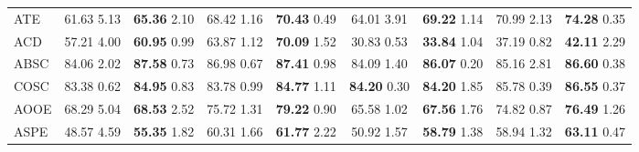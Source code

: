 \documentclass[11pt]{article}
\begin{document}
\begin{table*}[]
{\begin{tabular}{l|cccc|cccc}
ATE                            & 61.63             \tiny{  5.13}            &\multicolumn{1}{c|}{ \textbf{65.36}        \tiny{ 2.10}}    & 68.42          \tiny{ 1.16}           & \textbf{70.43}        \tiny{ 0.49}      & 64.01                 \tiny{ 3.91}        & \multicolumn{1}{c|}{\textbf{69.22}      \tiny{ 1.14}}            & 70.99           \tiny{  2.13}            & \textbf{74.28}        \tiny{ 0.35 }        \\
ACD                            & 57.21             \tiny{  4.00}            & \multicolumn{1}{c|}{\textbf{60.95} \tiny{ 0.99}}           & 63.87          \tiny{ 1.12}           & \textbf{70.09}        \tiny{ 1.52}             & 30.83                \tiny{ 0.53}        & \multicolumn{1}{c|}{\textbf{33.84}      \tiny{ 1.04}}             & 37.19           \tiny{ 0.82}            & \textbf{42.11}        \tiny{ 2.29}        \\
ABSC                           & 84.06             \tiny{  2.02}            & \multicolumn{1}{c|}{\textbf{87.58}       \tiny{ 0.73 } }        & 86.98           \tiny{ 0.67}            & \textbf{87.41}      \tiny{ 0.98}      & 84.09                \tiny{  1.40}        & \multicolumn{1}{c|}{\textbf{86.07}     \tiny{ 0.20}}              & 85.16           \tiny{ 2.81}            & \textbf{86.60}        \tiny{ 0.38}        \\
COSC                           & 83.38  \tiny{  0.62}  &\multicolumn{1}{c|}{ \textbf{84.95}\tiny{ 0.83} }        & 83.78           \tiny{ 0.99}            & \textbf{84.77}     \tiny{ 1.11}       & \textbf{84.20}        \tiny{ 0.30}        & \multicolumn{1}{c|}{\textbf{84.20}     \tiny{ 1.85}}          & 85.78           \tiny{ 0.39}            & \textbf{86.55}        \tiny{  0.37}      \\
AOOE                           & 68.29             \tiny{  5.04}           & \multicolumn{1}{c|}{\textbf{68.53}        \tiny{ 2.52}}              & 75.72           \tiny{ 1.31}            & \textbf{79.22}      \tiny{ 0.90 }      & 65.58                \tiny{ 1.02}        & \multicolumn{1}{c|}{\textbf{67.56}     \tiny{ 1.76}}               & 74.82            \tiny{ 0.87}            & \textbf{76.49}        \tiny{ 1.26}        \\
\midrule
ASPE                           & 48.57             \tiny{  4.59}            & \multicolumn{1}{c|}{\textbf{55.35}       \tiny{ 1.82}}  & 60.31         \tiny{ 1.66}            & \textbf{61.77}       \tiny{ 2.22}      & 50.92                \tiny{ 1.57}        & \multicolumn{1}{c|}{\textbf{58.79}        \tiny{ 1.38}}           & 58.94          \tiny{ 1.32}            & \textbf{63.11}       \tiny{ 0.47}      \\

\end{tabular}}
\end{table*}
\end{document}
